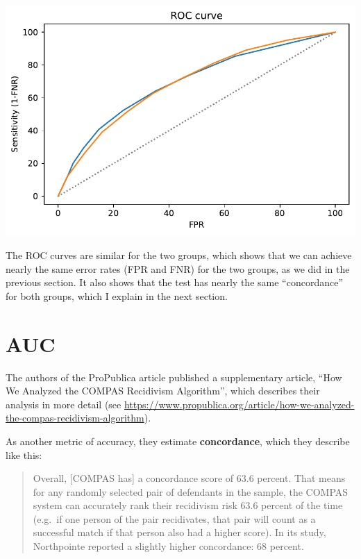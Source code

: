 \begin{center}
\includegraphics[scale=0.75]{chapters/02_calibration_files/02_calibration_66_0.pdf}
\end{center}

The ROC curves are similar for the two groups, which shows that we can
achieve nearly the same error rates (FPR and FNR) for the two groups, as
we did in the previous section. It also shows that the test has nearly
the same ``concordance'' for both groups, which I explain in the next
section.

\hypertarget{auc}{%
\section{AUC}\label{auc}}

The authors of the ProPublica article published a supplementary article,
``How We Analyzed the COMPAS Recidivism Algorithm'', which describes
their analysis in more detail (see
\url{https://www.propublica.org/article/how-we-analyzed-the-compas-recidivism-algorithm}).

As another metric of accuracy, they estimate \textbf{concordance}, which
they describe like this:

\begin{quote}
Overall, {[}COMPAS has{]} a concordance score of 63.6 percent. That
means for any randomly selected pair of defendants in the sample, the
COMPAS system can accurately rank their recidivism risk 63.6 percent of
the time (e.g.~if one person of the pair recidivates, that pair will
count as a successful match if that person also had a higher score). In
its study, Northpointe reported a slightly higher concordance: 68
percent.
\end{quote}

